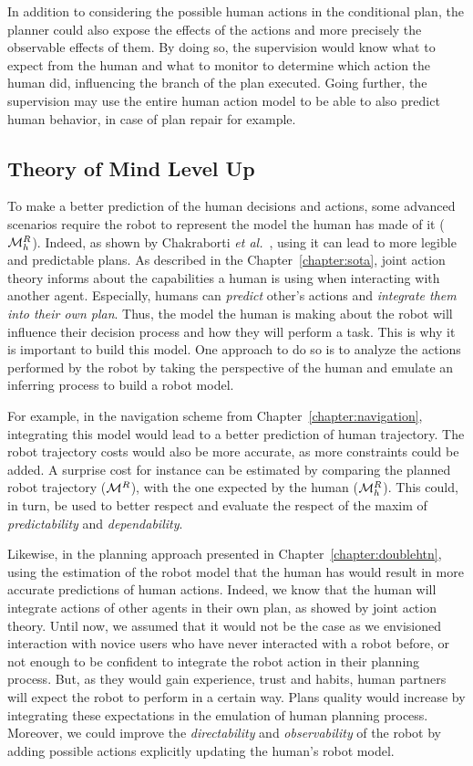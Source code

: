\documentclass[a4paper,11pt,twoside]{StyleThese}
\begin{document}
In addition to considering the possible human actions in the conditional plan, the planner could also expose the effects of the actions and more precisely the observable effects of them. By doing so, the supervision would know what to expect from the human and what to monitor to determine which action the human did, influencing the branch of the plan executed. Going further, the supervision may use the entire human action model to be able to also predict human behavior, in case of plan repair for example.

\subsection*{Theory of Mind Level Up}
To make a better prediction of the human decisions and actions, some advanced scenarios require the robot to represent the model the human has made of it ($\mathcal{M}^R_h$). Indeed, as shown by Chakraborti \textit{et al.}~\cite{chakraborti2017plan}, using it can lead to more legible and predictable plans. As described in the Chapter~\ref{chapter:sota}, joint action theory informs about the capabilities a human is using when interacting with another agent. Especially, humans can \textit{predict} other's actions and \textit{integrate them into their own plan}. Thus, the model the human is making about the robot will influence their decision process and how they will perform a task. This is why it is important to build this model. One approach to do so is to analyze the actions performed by the robot by taking the perspective of the human and emulate an inferring process to build a robot model.

For example, in the navigation scheme from Chapter~\ref{chapter:navigation}, integrating this model would lead to a better prediction of human trajectory. The robot trajectory costs would also be more accurate, as more constraints could be added. A surprise cost for instance can be estimated by comparing the planned robot trajectory ($\mathcal{M}^R$), with the one expected by the human ($\mathcal{M}^R_h$). This could, in turn, be used to better respect and evaluate the respect of the maxim of \textit{predictability} and \textit{dependability}.

Likewise, in the planning approach presented in Chapter~\ref{chapter:doublehtn}, using the estimation of the robot model that the human has would result in more accurate predictions of human actions. Indeed, we know that the human will integrate actions of other agents in their own plan, as showed by joint action theory. Until now, we assumed that it would not be the case as we envisioned interaction with novice users who have never interacted with a robot before, or not enough to be confident to integrate the robot action in their planning process. But, as they would gain experience, trust and habits, human partners will expect the robot to perform in a certain way. Plans quality would increase by integrating these expectations in the emulation of human planning process. Moreover, we could improve the \textit{directability} and \textit{observability} of the robot by adding possible actions explicitly updating the human's robot model.


\ifdefined{}
\else


\end{document}
